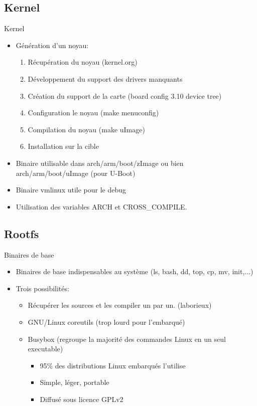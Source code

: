 \subsection{Kernel}
\begin{frame}{Kernel}{}
  \begin{itemize}
  \item Génération d'un noyau:
    \begin{enumerate}
    \item Récupération du noyau (kernel.org)
    \item Développement du support des drivers manquants
    \item Création du support de la carte (board config  3.10 device tree)
    \item Configuration le noyau (make menuconfig)
    \item Compilation du noyau (make uImage)
    \item Installation sur la cible
    \end{enumerate}
  \item Binaire utilisable dans arch/arm/boot/zImage ou bien arch/arm/boot/uImage (pour U-Boot)
  \item Binaire vmlinux utile pour le debug
  \item Utilisation des variables ARCH et CROSS\_COMPILE.
  \end{itemize}
\end{frame}

\subsection{Rootfs}
\begin{frame}{Binaires de base}{}
  \begin{itemize}
  \item Binaires de base indispensables au système (ls, bash, dd, top, cp, mv, init,...)
  \item Trois possibilités:
    \begin{itemize}
    \item Récupérer les sources et les compiler un par un. (laborieux)
    \item GNU/Linux coreutils (trop lourd pour l'embarqué)
    \item Busybox (regroupe la majorité des commandes Linux en un seul executable)
      \begin{itemize}
      \item 95\% des distributions Linux embarqués l'utilise
      \item Simple, léger, portable
      \item Diffusé sous licence GPLv2
      \end{itemize}
    \end{itemize}
  \end{itemize}
\end{frame}

